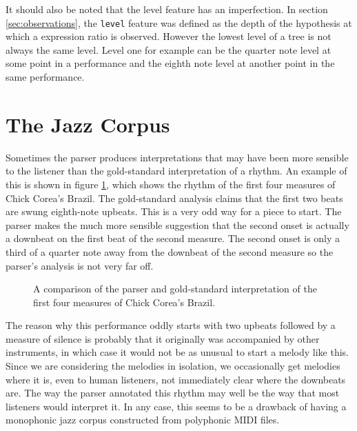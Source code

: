 It should also be noted that the level feature has an imperfection. In section \ref{sec:observations}, the \texttt{level} feature was defined as the depth of the hypothesis at which a expression ratio is observed. However the lowest level of a tree is not always the same level. Level one for example can be the quarter note level at some point in a performance and the eighth note level at another point in the same performance. 


\section{The Jazz Corpus}

Sometimes the parser produces interpretations that may have been more sensible to the listener than the gold-standard interpretation of a rhythm. An example of this is shown in figure \ref{fig:brazil}, which shows the rhythm of the first four measures of Chick Corea's Brazil. The gold-standard analysis claims that the first two beats are swung eighth-note upbeats. This is a very odd way for a piece to start. The parser makes the much more sensible suggestion that the second onset is actually a downbeat on the first beat of the second measure. The second onset is only a third of a quarter note away from the downbeat of the second measure so the parser's analysis is not very far off. 

\begin{figure}
\centering
{}

\caption{A comparison of the parser and gold-standard interpretation of the first four measures of Chick Corea's Brazil.}
\label{fig:brazil}
\end{figure}


The reason why this performance oddly starts with two upbeats followed by a measure of silence is probably that it originally was accompanied by other instruments, in which case it would not be as unusual to start a melody like this. Since we are considering the melodies in isolation, we occasionally get melodies where it is, even to human listeners, not immediately clear where the downbeats are. The way the parser annotated this rhythm may well be the way that most listeners would interpret it. In any case, this seems to be a drawback of having a monophonic jazz corpus constructed from polyphonic MIDI files.





